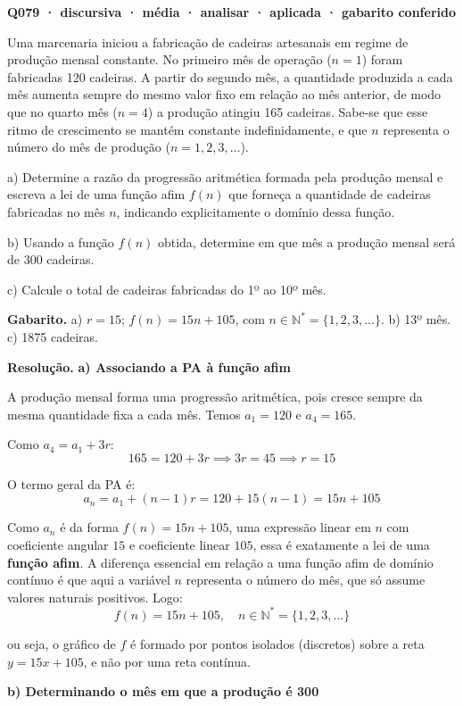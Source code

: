 \documentclass[11pt,a4paper]{article}
\begin{document}
\bigskip\noindent\textbf{Q079 · discursiva · média · analisar · aplicada · gabarito conferido}\par\nopagebreak
Uma marcenaria iniciou a fabricação de cadeiras artesanais em regime de produção mensal constante. No primeiro mês de operação ($n=1$) foram fabricadas 120 cadeiras. A partir do segundo mês, a quantidade produzida a cada mês aumenta sempre do mesmo valor fixo em relação ao mês anterior, de modo que no quarto mês ($n=4$) a produção atingiu 165 cadeiras. Sabe-se que esse ritmo de crescimento se mantém constante indefinidamente, e que $n$ representa o número do mês de produção ($n = 1, 2, 3, \dots$).

a) Determine a razão da progressão aritmética formada pela produção mensal e escreva a lei de uma função afim $f(n)$ que forneça a quantidade de cadeiras fabricadas no mês $n$, indicando explicitamente o domínio dessa função.

b) Usando a função $f(n)$ obtida, determine em que mês a produção mensal será de 300 cadeiras.

c) Calcule o total de cadeiras fabricadas do 1º ao 10º mês.

\textbf{Gabarito.} a) $r = 15$; $f(n) = 15n + 105$, com $n \in \mathbb{N}^* = \{1,2,3,\dots\}$. b) 13º mês. c) 1875 cadeiras.

\textbf{Resolução.} \textbf{a) Associando a PA à função afim}

A produção mensal forma uma progressão aritmética, pois cresce sempre da mesma quantidade fixa a cada mês. Temos $a_1 = 120$ e $a_4 = 165$.

Como $a_4 = a_1 + 3r$:
$$165 = 120 + 3r \implies 3r = 45 \implies r = 15$$

O termo geral da PA é:
$$a_n = a_1 + (n-1)r = 120 + 15(n-1) = 15n + 105$$

Como $a_n$ é da forma $f(n) = 15n + 105$, uma expressão linear em $n$ com coeficiente angular $15$ e coeficiente linear $105$, essa é exatamente a lei de uma \textbf{função afim}. A diferença essencial em relação a uma função afim de domínio contínuo é que aqui a variável $n$ representa o número do mês, que só assume valores naturais positivos. Logo:
$$f(n) = 15n + 105, \quad n \in \mathbb{N}^* = \{1, 2, 3, \dots\}$$

ou seja, o gráfico de $f$ é formado por pontos isolados (discretos) sobre a reta $y = 15x + 105$, e não por uma reta contínua.

\textbf{b) Determinando o mês em que a produção é 300}
\end{document}
